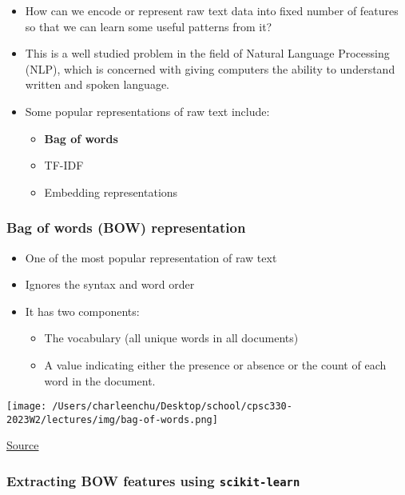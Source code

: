 \documentclass[11pt]{article}
\providecommand{\tightlist}{%
      \setlength{\itemsep}{0pt}\setlength{\parskip}{0pt}}
\begin{document}
    \begin{itemize}
\tightlist
\item
  How can we encode or represent raw text data into fixed number of
  features so that we can learn some useful patterns from it?\\
\item
  This is a well studied problem in the field of Natural Language
  Processing (NLP), which is concerned with giving computers the ability
  to understand written and spoken language.
\item
  Some popular representations of raw text include:

  \begin{itemize}
  \tightlist
  \item
    \textbf{Bag of words}
  \item
    TF-IDF
  \item
    Embedding representations
  \end{itemize}
\end{itemize}

    \subsubsection{Bag of words (BOW)
representation}\label{bag-of-words-bow-representation}

\begin{itemize}
\tightlist
\item
  One of the most popular representation of raw text
\item
  Ignores the syntax and word order
\item
  It has two components:

  \begin{itemize}
  \tightlist
  \item
    The vocabulary (all unique words in all documents)
  \item
    A value indicating either the presence or absence or the count of
    each word in the document.
  \end{itemize}
\end{itemize}

\texttt{[image: /Users/charleenchu/Desktop/school/cpsc330-2023W2/lectures/img/bag-of-words.png]}

\href{https://web.stanford.edu/~jurafsky/slp3/4.pdf}{Source}

    \subsubsection{\texorpdfstring{Extracting BOW features using
\texttt{scikit-learn}}{Extracting BOW features using scikit-learn}}\label{extracting-bow-features-using-scikit-learn}
\end{document}
